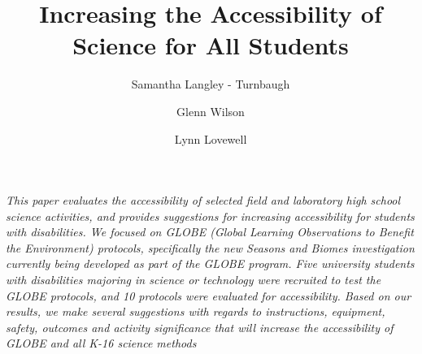 \documentclass[11.5pt]{sig-alternate} %
\makeatletter
\let\oldabstract\abstract
\let\oldendabstract\endabstract
\renewenvironment{abstract} %
{\renewenvironment{quotation}%
               {\list{}{\addtolength{\leftmargin}{1em} %
                        \listparindent 1.5em%
                        \itemindent    \listparindent%
                        \rightmargin   \leftmargin%
                        \parsep        \z@ \@plus\p@}%
                \item\relax}%
               {\endlist}%
\oldabstract}
{\oldendabstract}
\makeatother
\begin{document}
\title{Increasing the Accessibility of Science for All Students}

\author[1]{\large \color{blue}Samantha Langley - Turnbaugh}
\author[1]{\large \color{blue}Glenn Wilson}
\author[1]{\large \color{blue}Lynn Lovewell}


\toappear{}
\maketitle
\begin{@twocolumnfalse} 
\begin{abstract}
\item 
\textit{This paper evaluates the accessibility of selected field and laboratory high school science
activities, and provides suggestions for increasing accessibility for students with disabilities. We
focused on GLOBE (Global Learning Observations to Benefit the Environment) protocols, specifically
the new Seasons and Biomes investigation currently being developed as part of the GLOBE program.
Five university students with disabilities majoring in science or technology were recruited to test the GLOBE protocols, and 10 protocols were evaluated for accessibility. Based on our results, we make
several suggestions with regards to instructions, equipment, safety, outcomes and activity significance that will increase the accessibility of GLOBE and all K-16 science methods}
\\ \\

\end{abstract}
\end{@twocolumnfalse}

\end{document}
